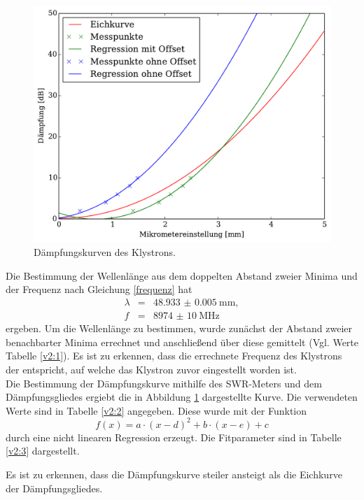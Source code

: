 \begin{figure}
	\includegraphics[width = 14cm]{pic/Daempfung.pdf}
	\caption[]{Dämpfungskurven des Klystrons.}
	\label{daempf}
\end{figure}

Die Bestimmung der Wellenlänge aus dem doppelten Abstand zweier Minima und der Frequenz nach Gleichung \eqref{frequenz} hat
\begin{eqnarray}
	\lambda &=& \SI{48.933(5)}{\milli\meter},\\
	f &=& \SI{8974(10)}{\mega\hertz}
\end{eqnarray}
ergeben.
Um die Wellenlänge zu bestimmen, wurde zunächst der Abstand zweier benachbarter Minima errechnet und anschließend über diese gemittelt (Vgl. Werte Tabelle \ref{v2:1}).
Es ist zu erkennen, dass die errechnete Frequenz des Klystrons der entspricht, auf welche das Klystron zuvor eingestellt worden ist.\\

Die Bestimmung der Dämpfungskurve mithilfe des SWR-Meters und dem Dämpfungsgliedes ergiebt die in Abbildung \ref{daempf} dargestellte Kurve.
Die verwendeten Werte sind in Tabelle \ref{v2:2} angegeben.
Diese wurde mit der Funktion
\begin{equation}
	f(x)=a \cdot (x-d)^2 + b \cdot (x-e) + c
\end{equation}
durch eine nicht linearen Regression erzeugt.
Die Fitparameter sind in Tabelle \ref{v2:3} dargestellt.

Es ist zu erkennen, dass die Dämpfungskurve steiler ansteigt als die Eichkurve der Dämpfungsgliedes.

